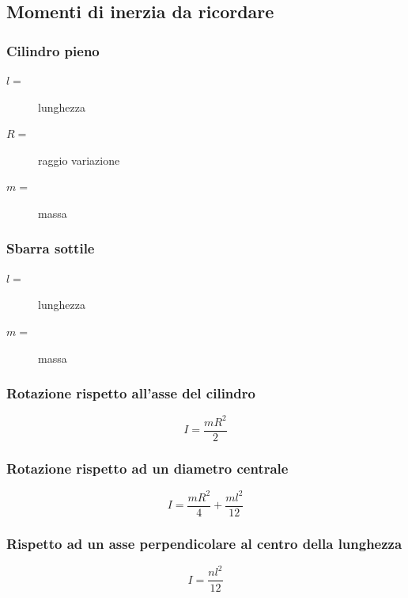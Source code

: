 \documentclass{book}
\begin{document}
\subsection{Momenti di inerzia da ricordare}
\label{sec:momdiinerziadaric}
\begin{multicols}{2}
  \subsubsection{Cilindro pieno}
  \label{sec:cilpiandove}
  \begin{description}
  \item[$l=$] lunghezza
  \item[$R=$] raggio variazione
  \item[$m=$] massa
  \end{description}
  
  \subsubsection{Sbarra sottile}
  \label{sec:sbarrasottile}
  \begin{description}
  \item[$l=$] lunghezza
  \item[$m=$] massa
  \end{description}
  
  \subsubsection{Rotazione rispetto all'asse del cilindro}
  \label{sec:rotrispalassdelcil}
  \begin{equation}
    \label{eq:rotrispalassdelcil}
    I=\frac{mR^2}{2}
  \end{equation}
  
  \subsubsection{Rotazione rispetto ad un diametro centrale}
  \label{sec:rotrispadundiamcent}
  \begin{equation}
    \label{eq:rotrispadundiamcent}
    I=\frac{mR^2}{4}+\frac{ml^2}{12}
  \end{equation}
  
  \subsubsection{Rispetto ad un asse perpendicolare al centro della lunghezza}
  \label{sec:risadunasperalcentrodellung}
  \begin{equation}
    \label{eq:risadunasperalcentrodellung}
    I=\frac{nl^2}{12}
  \end{equation}
  

\end{multicols}
\end{document}
